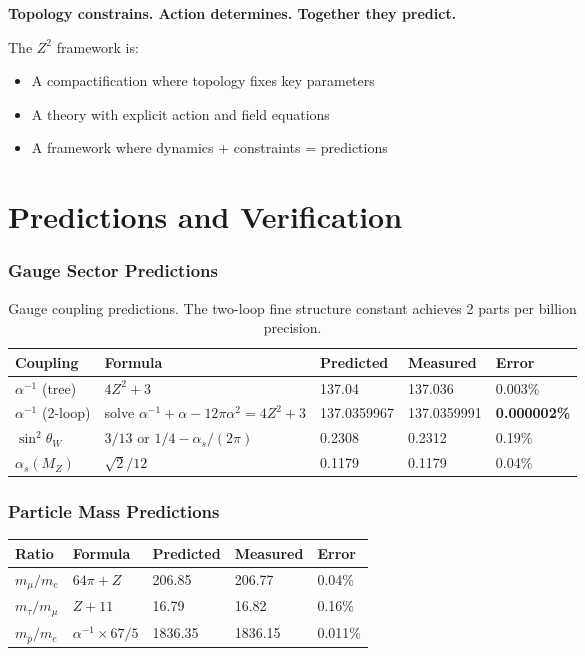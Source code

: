 \documentclass[11pt,a4paper]{article}
\theoremstyle{plain}
\theoremstyle{definition}
\theoremstyle{remark}
\newcommand{\MZ}{M_Z}
\newcommand{\alphas}{\alpha_s}
\newcommand{\thetaW}{\theta_W}
\begin{document}
\textbf{Topology constrains. Action determines. Together they predict.}

The $Z^2$ framework is:
\begin{itemize}
  \item A compactification where topology fixes key parameters
  \item A theory with explicit action and field equations
  \item A framework where dynamics + constraints = predictions
\end{itemize}

\part{Predictions and Verification}

\section{Gauge Sector Predictions}

\begin{table}[h!]
\centering
\begin{tabular}{lllll}
\toprule
\textbf{Coupling} & \textbf{Formula} & \textbf{Predicted} & \textbf{Measured} & \textbf{Error} \\
\midrule
$\alpha^{-1}$ (tree) & $4Z^2 + 3$ & 137.04 & 137.036 & 0.003\% \\
$\alpha^{-1}$ (2-loop) & solve $\alpha^{-1} + \alpha - 12\pi\alpha^2 = 4Z^2 + 3$ & 137.0359967 & 137.0359991 & \textbf{0.000002\%} \\
$\sin^2\thetaW$ & $3/13$ or $1/4 - \alphas/(2\pi)$ & 0.2308 & 0.2312 & 0.19\% \\
$\alphas(\MZ)$ & $\sqrt{2}/12$ & 0.1179 & 0.1179 & 0.04\% \\
\bottomrule
\end{tabular}
\caption{Gauge coupling predictions. The two-loop fine structure constant achieves 2 parts per billion precision.}
\end{table}

\section{Particle Mass Predictions}

\begin{table}[h!]
\centering
\begin{tabular}{lllll}
\toprule
\textbf{Ratio} & \textbf{Formula} & \textbf{Predicted} & \textbf{Measured} & \textbf{Error} \\
\midrule
$m_\mu/m_e$ & $64\pi + Z$ & 206.85 & 206.77 & 0.04\% \\
$m_\tau/m_\mu$ & $Z + 11$ & 16.79 & 16.82 & 0.16\% \\
$m_p/m_e$ & $\alpha^{-1} \times 67/5$ & 1836.35 & 1836.15 & 0.011\% \\
\bottomrule
\end{tabular}
\end{table}
\end{document}
